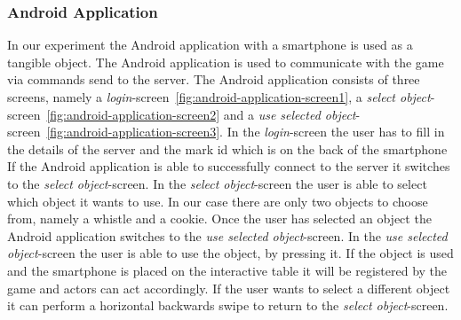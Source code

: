 \documentclass[a4paper,10pt]{report}
\begin{document}
	\subsubsection{Android Application}
	In our experiment the Android application with a smartphone is used as a tangible object.
	The Android application is used to communicate with the game via commands send to the server.
	The Android application consists of three screens, namely a \emph{login}-screen~\ref{fig:android-application-screen1}, a \emph{select object}-screen~\ref{fig:android-application-screen2} and a \emph{use selected object}-screen~\ref{fig:android-application-screen3}.
	In the \emph{login}-screen the user has to fill in the details of the server and the mark id which is on the back of the smartphone
	If the Android application is able to successfully connect to the server it switches to the \emph{select object}-screen.
	In the \emph{select object}-screen the user is able to select which object it wants to use.
	In our case there are only two objects to choose from, namely a whistle and a cookie.
	Once the user has selected an object the Android application switches to the \emph{use selected object}-screen.
	In the \emph{use selected object}-screen the user is able to use the object, by pressing it.
	If the object is used and the smartphone is placed on the interactive table it will be registered by the game and actors can act accordingly.
	If the user wants to select a different object it can perform a horizontal backwards swipe to return to the \emph{select object}-screen.
	
\end{document}
